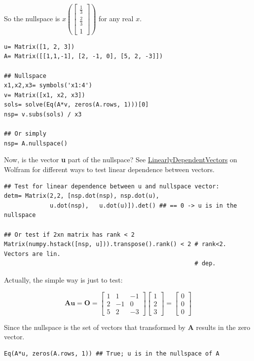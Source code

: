 So the nullspace is $x(\left[\begin{matrix}\frac{1}{3}\\\frac{2}{3}\\1\end{matrix}\right])$
for any real $x$.

\begin{verbatim}
u= Matrix([1, 2, 3])
A= Matrix([[1,1,-1], [2, -1, 0], [5, 2, -3]])

## Nullspace
x1,x2,x3= symbols('x1:4')
v= Matrix([x1, x2, x3])
sols= solve(Eq(A*v, zeros(A.rows, 1)))[0]
nsp= v.subs(sols) / x3

## Or simply
nsp= A.nullspace()
\end{verbatim}

Now, is the vector \textbf{u} part of the nullspace? See
\href{http://mathworld.wolfram.com/LinearlyDependentVectors.html}{LinearlyDependentVectors}
on Wolfram for different ways to test linear dependence between vectors.

\begin{verbatim}
## Test for linear dependence between u and nullspace vector:
detm= Matrix(2,2, [nsp.dot(nsp), nsp.dot(u),
             u.dot(nsp),   u.dot(u)]).det() ## == 0 -> u is in the nullspace

## Or test if 2xn matrix has rank < 2
Matrix(numpy.hstack([nsp, u])).transpose().rank() < 2 # rank<2. Vectors are lin.
                                                      # dep.
\end{verbatim}

Actually, the simple way is just to test:

$$
\mathbf{Au = O} =
\left[\begin{matrix}1 & 1 & -1\\2 & -1 & 0\\5 & 2 & -3\end{matrix}\right]
\left[\begin{matrix}1\\2\\3\end{matrix}\right] =
\left[\begin{matrix}0\\0\\0\end{matrix}\right]
$$

Since the nullspace is the set of vectors that transformed by \textbf{A} results
in the zero vector.

\begin{verbatim}
Eq(A*u, zeros(A.rows, 1)) ## True; u is in the nullspace of A
\end{verbatim}

